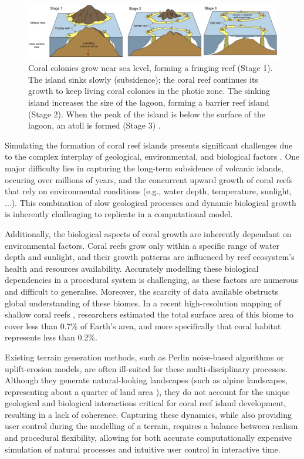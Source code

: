 \begin{figure}[H]
    \includegraphics[width = \linewidth]{other_images/Drawings/Darwin_corals-color-Terry2012.jpg}
    \caption{Coral colonies grow near sea level, forming a fringing reef (Stage 1). The island sinks slowly (subsidence); the coral reef continues its growth to keep living coral colonies in the photic zone. The sinking island increases the size of the lagoon, forming a barrier reef island (Stage 2). When the peak of the island is below the surface of the lagoon, an atoll is formed (Stage 3) \cite{Terry2013}.}
    \label{fig:coral-island-reef-growth}
\end{figure}

Simulating the formation of coral reef islands presents significant challenges due to the complex interplay of geological, environmental, and biological factors \cite{Hopley2014}. One major difficulty lies in capturing the long-term subsidence of volcanic islands, occuring over millions of years, and the concurrent upward growth of coral reefs that rely on environmental conditions (e.g., water depth, temperature, sunlight, ...). This combination of slow geological processes and dynamic biological growth is inherently challenging to replicate in a computational model.

Additionally, the biological aspects of coral growth are inherently dependant on environmental factors. Coral reefs grow only within a specific range of water depth and sunlight, and their growth patterns are influenced by reef ecosystem's health and resources availability. Accurately modelling these biological dependencies in a procedural system is challenging, as these factors are numerous and difficult to generalise. Moreover, the scarcity of data available obstructs global understanding of these biomes. In a recent high-resolution mapping of shallow coral reefs \cite{Lyons2024}, researchers estimated the total surface area of this biome to cover less than 0.7\% of Earth's area, and more specifically that coral habitat represents less than 0.2\%.

Existing terrain generation methods, such as Perlin noise-based algorithms or uplift-erosion models, are often ill-suited for these multi-disciplinary processes. Although they generate natural-looking landscapes (such as alpine landscapes, representing about a quarter of land area \cite{Korner2014}), they do not account for the unique geological and biological interactions critical for coral reef island development, resulting in a lack of coherence. Capturing these dynamics, while also providing user control during the modelling of a terrain, requires a balance between realism and procedural flexibility, allowing for both accurate computationally expensive simulation of natural processes and intuitive user control in interactive time.

